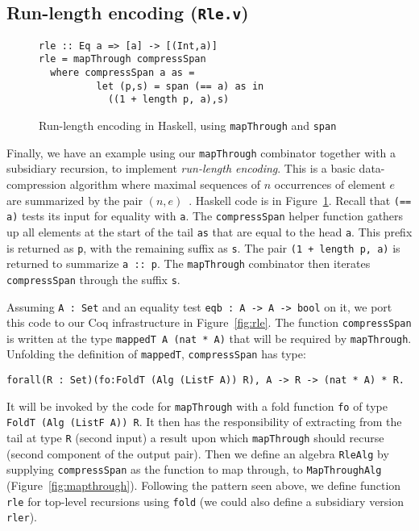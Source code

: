 \documentclass[a4paper,USenglish]{lipics-v2021}
\begin{document}
\subsection{Run-length encoding (\texttt{Rle.v})}

\begin{figure}
\begin{verbatim}
rle :: Eq a => [a] -> [(Int,a)]
rle = mapThrough compressSpan
  where compressSpan a as =
          let (p,s) = span (== a) as in
            ((1 + length p, a),s)
\end{verbatim} 
\caption{Run-length encoding in Haskell, using \texttt{mapThrough} and \texttt{span}}
\label{fig:rlehs}
\end{figure}

Finally, we have an example using our \verb|mapThrough| combinator
together with a subsidiary recursion, to implement \emph{run-length
encoding}.  This is a basic data-compression algorithm where maximal
sequences of $n$ occurrences of element $e$ are summarized by the pair
$(n,e)$~\cite{datacomp}.  Haskell code is in Figure~\ref{fig:rlehs}.
Recall that \verb|(== a)| tests its input for equality with \verb|a|.
The \verb|compressSpan| helper function gathers up all elements at the
start of the tail \verb|as| that are equal to the head \verb|a|.  This
prefix is returned as \verb|p|, with the remaining suffix as \verb|s|.
The pair \verb|(1 + length p, a)| is returned to summarize
\verb|a :: p|.  The \verb|mapThrough| combinator then iterates
\verb|compressSpan| through the suffix \verb|s|.

Assuming \verb|A : Set| and an equality test \verb|eqb : A -> A -> bool| on it,
we port this code to our Coq infrastructure in Figure~\ref{fig:rle}.
The function \verb|compressSpan| is written at the type \verb|mappedT A (nat * A)| that
will be required by \verb|mapThrough|.  Unfolding the definition of \verb|mappedT|,
\verb|compressSpan| has type:
\begin{verbatim}
forall(R : Set)(fo:FoldT (Alg (ListF A)) R), A -> R -> (nat * A) * R.
\end{verbatim}
\noindent It will be invoked by the code for \verb|mapThrough| with a
fold function \verb|fo| of type \verb|FoldT (Alg (ListF A)) R|.  It then has the
responsibility of extracting from the tail at type \verb|R| (second input) 
a result upon which \verb|mapThrough| should recurse (second component
of the output pair).  Then we define an algebra \verb|RleAlg| by
supplying \verb|compressSpan| as the function to map through, to
\verb|MapThroughAlg| (Figure~\ref{fig:mapthrough}).  Following the
pattern seen above, we define function \verb|rle| for top-level
recursions using \verb|fold| (we could also define a subsidiary version
\verb|rler|).
\end{document}
